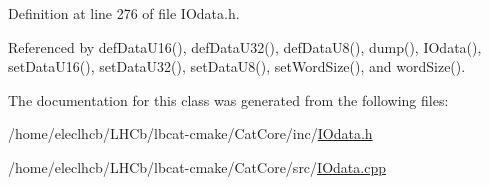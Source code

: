 Definition at line 276 of file I\+Odata.\+h.



Referenced by def\+Data\+U16(), def\+Data\+U32(), def\+Data\+U8(), dump(), I\+Odata(), set\+Data\+U16(), set\+Data\+U32(), set\+Data\+U8(), set\+Word\+Size(), and word\+Size().



The documentation for this class was generated from the following files\+:\begin{DoxyCompactItemize}
\item 
/home/eleclhcb/\+L\+H\+Cb/lbcat-\/cmake/\+Cat\+Core/inc/\hyperlink{IOdata_8h}{I\+Odata.\+h}\item 
/home/eleclhcb/\+L\+H\+Cb/lbcat-\/cmake/\+Cat\+Core/src/\hyperlink{IOdata_8cpp}{I\+Odata.\+cpp}\end{DoxyCompactItemize}
